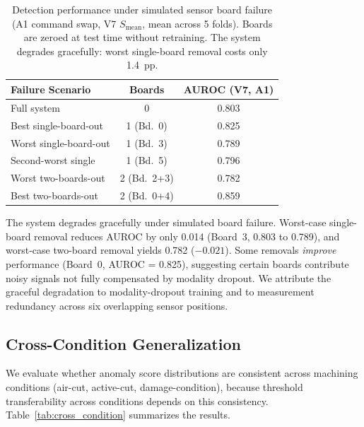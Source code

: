 \begin{table}[t]
\centering
\caption{Detection performance under simulated sensor board failure (A1 command swap, V7 $S_{\text{mean}}$, mean across 5 folds). Boards are zeroed at test time without retraining. The system degrades gracefully: worst single-board removal costs only 1.4~pp.}
\label{tab:sensor_failure}
\begin{tabular}{@{}lcc@{}}
\toprule
Failure Scenario & Boards & AUROC (V7, A1) \\
\midrule
Full system              & 0 & 0.803 \\
Best single-board-out    & 1 (Bd.\ 0) & 0.825 \\
Worst single-board-out   & 1 (Bd.\ 3) & 0.789 \\
Second-worst single      & 1 (Bd.\ 5) & 0.796 \\
Worst two-boards-out     & 2 (Bd.\ 2+3) & 0.782 \\
Best two-boards-out      & 2 (Bd.\ 0+4) & 0.859 \\
\bottomrule
\end{tabular}
\end{table}

The system degrades gracefully under simulated board failure.
Worst-case single-board removal reduces AUROC by only 0.014 (Board~3, 0.803 to 0.789), and worst-case two-board removal yields 0.782 ($-0.021$).
Some removals \emph{improve} performance (Board~0, AUROC = 0.825), suggesting certain boards contribute noisy signals not fully compensated by modality dropout.
We attribute the graceful degradation to modality-dropout training and to measurement redundancy across six overlapping sensor positions.

\subsection{Cross-Condition Generalization}
\label{sec:ablation_crosscondition}

We evaluate whether anomaly score distributions are consistent across machining conditions (air-cut, active-cut, damage-condition), because threshold transferability across conditions depends on this consistency.
Table~\ref{tab:cross_condition} summarizes the results.

